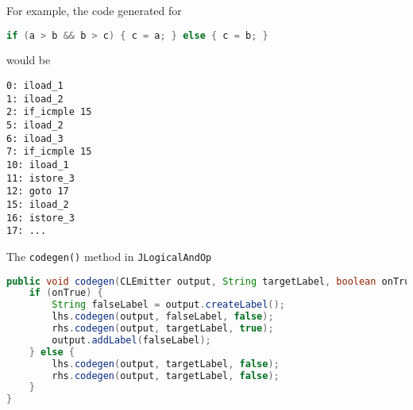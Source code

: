 \documentclass[8pt,a4paper,compress]{beamer}
\begin{document}
\begin{frame}[fragile]
\pause

For example, the code generated for 

\smallskip

\begin{lstlisting}[language=Java,style=focusin]
if (a > b && b > c) { c = a; } else { c = b; }
\end{lstlisting}

would be

\begin{lstlisting}[language={},style=focusin]
0: iload_1
1: iload_2
2: if_icmple 15
5: iload_2
6: iload_3
7: if_icmple 15
10: iload_1
11: istore_3
12: goto 17
15: iload_2
16: istore_3
17: ...
\end{lstlisting}

\pause
\bigskip

The \lstinline{codegen()} method in \lstinline{JLogicalAndOp}

\smallskip

\begin{lstlisting}[language=Java,style=focusin]
public void codegen(CLEmitter output, String targetLabel, boolean onTrue) {
    if (onTrue) {
        String falseLabel = output.createLabel();
        lhs.codegen(output, falseLabel, false);
        rhs.codegen(output, targetLabel, true);
        output.addLabel(falseLabel);
    } else {
        lhs.codegen(output, targetLabel, false);
        rhs.codegen(output, targetLabel, false);
    }
}
\end{lstlisting}
\end{frame}
\end{document}
